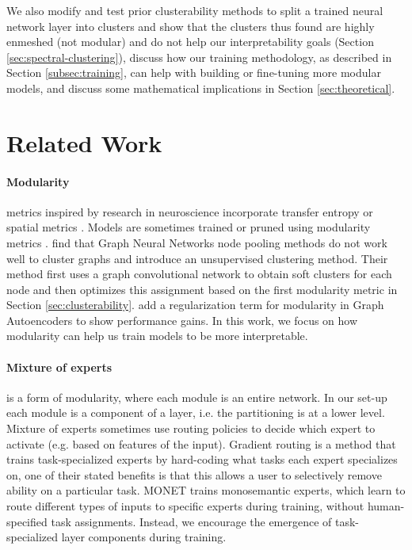 We also modify and test prior clusterability methods to split a trained neural network layer into clusters and show that the clusters thus found are highly enmeshed (not modular) and do not help our interpretability goals (Section \ref{sec:spectral-clustering}), discuss how our training methodology, as described in Section \ref{subsec:training}, can help with building or fine-tuning more modular models, and discuss some mathematical implications in Section \ref{sec:theoretical}.


\section{Related Work}
\label{sec:related}

\paragraph{Modularity} metrics inspired by research in neuroscience incorporate transfer entropy \citep{novelli2019deriving, ursino2020transfer} %
or spatial metrics \citep{liu2023seeing, liu2023growing}. %
Models are sometimes trained or pruned using modularity metrics \citep{patil2023neural}.
\citet{tsitsulin2023graph} find that Graph Neural Networks node pooling methods do not work well to cluster graphs and introduce an unsupervised clustering method.
Their method first uses a graph convolutional network to obtain soft clusters for each node and then 
optimizes this assignment based on the first modularity metric in Section \ref{sec:clusterability}.
\citet{salha2022modularity} add a regularization term for modularity in Graph Autoencoders to show performance gains. In this work, we focus on how modularity can help us train models to be more interpretable.


\paragraph{Mixture of experts} is a form of modularity, where each module is an entire network. In our set-up each module is a component of a layer, i.e. the partitioning is at a lower level. Mixture of experts sometimes use routing policies to decide which expert to activate (e.g. based on features of the input).
Gradient routing \citep{cloud2024gradient} is a method that trains task-specialized experts by hard-coding what tasks each expert specializes on, one of their stated benefits is that this allows a user to selectively remove ability on a particular task. 
MONET \citep{park2024monet} trains monosemantic experts, which learn to route different types of inputs to specific experts during training, without human-specified task assignments.
Instead, we encourage the emergence of task-specialized layer components during training.

